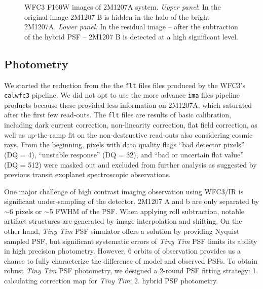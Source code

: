 \documentclass[apj]{emulateapj}
\newcommand{\ima}{\texttt{ima} files }
\newcommand{\flt}{\texttt{flt} files }
\newcommand{\tinytim}{\textit{Tiny Tim}}
\begin{document}

\begin{figure*}
  \centering
  \caption{WFC3 F160W images of 2M1207A system. {\em Upper panel}: In the original image 
    2M1207 B is hidden in the halo of the bright 2M1207A.   {\em Lower panel:} In the residual image -- after the subtraction of the hybrid PSF -- 2M1207 B is detected at a high significant level.}
  \label{fig:1}
\end{figure*}

\subsection{Photometry}

We started the reduction from the the \flt files produced by the
WFC3's \texttt{calwfc3} pipeline. We did not opt to use the more
advance \ima pipeline products because these provided less information
on 2M1207A, which saturated after the first few read-outs.  The \flt
are results of basic calibration, including dark current correction,
non-linearity correction, flat field correction, as well as
up-the-ramp fit on the non-destructive read-outs also considering
cosmic rays. From the beginning, pixels with data quality flags ``bad
detector pixels'' (DQ = 4), ``unstable response'' (DQ = 32), and ``bad
or uncertain flat value'' (DQ = 512) were masked out and excluded from
further analysis as suggested by previous transit exoplanet
spectroscopic observations\citep[e.g.][]{Berta2012, Kreidberg2014}.


One major challenge of high contrast imaging observation using WFC3/IR
is significant under-sampling of the detector.  2M1207 A and b are
only separated by $\sim6$ pixels or $\sim$5 FWHM of the PSF. When
applying roll subtraction, notable artifact structures are generated
by image interpolation and shifting. On the other hand, \tinytim{} PSF
simulator\citep{Krist1995} offers a solution by providing Nyquist
sampled PSF, but significant systematic errors of \tinytim{} PSF
 limits its ability in high precision
photometry\citep{Biretta2014}. However, 6 orbits of observation provides us a chance to
fully characterize the difference of model and observed PSFs. To obtain
robust \tinytim{} PSF photometry,  we designed a 2-round PSF fitting strategy: 1. calculating
correction map for \tinytim{}; 2. hybrid PSF photometry.
\end{document}
